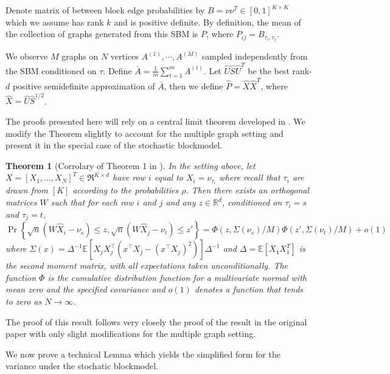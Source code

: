 \documentclass[10pt,letterpaper]{article}
\newtheorem{theorem}[fact]{Theorem}
\newcommand{\Ex}{\mathbb{E}}
\begin{document}
Denote matrix of between block edge probabilities by $B = \nu \nu^T\in[0,1]^{K\times K}$ which we assume has rank $k$ and is positive definite. 
By definition, the mean of the collection of graphs generated from this SBM is $P$, where $P_{ij} = B_{\tau_i, \tau_j}$. 

We observe $M$ graphs on $N$ vertices $A^{(1)}, \cdots, A^{(M)}$ sampled independently from the SBM conditioned on $\tau$.
Define $\bar{A} = \frac{1}{m} \sum_{t=1}^m A^{(t)}$. Let $\hat{U} \hat{S} \hat{U}^T$ be the best rank-$d$ positive semidefinite approximation of $\bar{A}$, then we define $\hat{P} = \hat{X} \hat{X}^T$, where $\hat{X} = \hat{U} \hat{S}^{1/2}$.




The proofs presented here will rely on a central limit theorem developed in \citet{athreya2013limit}. 
We modify the Theorem slightly to account for the multiple graph setting and present it in the special case of the stochastic blockmodel.

\begin{theorem}[Corrolary of Theorem 1 in \citet{athreya2013limit}]\label{thm:clt_ext}
  In the setting above, let $X=[X_1,\dotsc,X_N]^T\in\Re^{K\times d}$ have row $i$ equal to $X_i=\nu_{\tau_i}$ where recall that $\tau_i$ are drawn from $[K]$ according to the probabilities $\rho$.
	Then there exists an  orthogonal matrices $W$ such that for each row $i$ and $j$ and any $z \in \mathbb{R}^{d}$, conditioned on $\tau_i=s$ and $\tau_j=t$,
  \begin{equation}
    \label{eq:4}
    \Pr\left\{\sqrt{n}( W \hat{X}_i - \nu_s ) \leq z, \sqrt{n}( W \hat{X}_j - \nu_t) \leq z'\right\}
=  \Phi(z, \Sigma(\nu_s)/M)  \Phi(z', \Sigma(\nu_t)/M) +o(1)
  \end{equation}
  where $\Sigma(x) =\Delta^{-1}\Ex[ X_j X_j^\top(x^\top X_j -(x^\top
  X_j)^2)]\Delta^{-1}$ and $\Delta=\Ex[ X_1 X_{1}^{T}]$ is the second
  moment matrix, with all expectations taken unconditionally.
  The function $\Phi$ is the cumulative distribution function for a multivariate normal with mean zero and the specified covariance and $o(1)$ denotes a function that tends to zero as $N\to \infty$.
\end{theorem}
The proof of this result follows very closely the proof of the result in the original paper with only slight modifications for the multiple graph setting.

We now prove a technical Lemma which yields the simplified form for the variance under the stochatic blockmodel.
\end{document}
